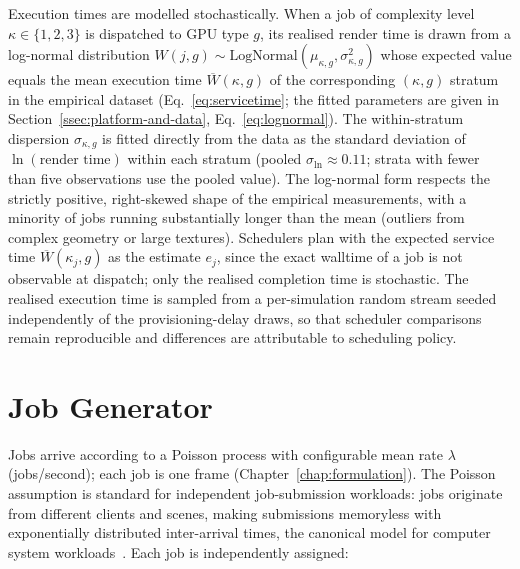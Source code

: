 Execution times are modelled stochastically. When a job of complexity level $\kappa \in \{1, 2, 3\}$ is dispatched to GPU type $g$, its realised render time is drawn from a log-normal distribution $W(j,g) \sim \text{LogNormal}(\mu_{\kappa,g}, \sigma_{\kappa,g}^2)$ whose expected value equals the mean execution time $\overline{W}(\kappa, g)$ of the corresponding $(\kappa, g)$ stratum in the empirical dataset (Eq.~\ref{eq:servicetime}; the fitted parameters are given in Section~\ref{ssec:platform-and-data}, Eq.~\ref{eq:lognormal}). The within-stratum dispersion $\sigma_{\kappa,g}$ is fitted directly from the data as the standard deviation of $\ln(\text{render time})$ within each stratum (pooled $\sigma_{\ln} \approx 0.11$; strata with fewer than five observations use the pooled value). The log-normal form respects the strictly positive, right-skewed shape of the empirical measurements, with a minority of jobs running substantially longer than the mean (outliers from complex geometry or large textures). Schedulers plan with the expected service time $\overline{W}(\kappa_j, g)$ as the estimate $e_j$, since the exact walltime of a job is not observable at dispatch; only the realised completion time is stochastic. The realised execution time is sampled from a per-simulation random stream seeded independently of the provisioning-delay draws, so that scheduler comparisons remain reproducible and differences are attributable to scheduling policy.

\section{Job Generator}
\label{sec:job-generator}

Jobs arrive according to a Poisson process with configurable mean rate $\lambda$ (jobs/second); each job is one frame (Chapter~\ref{chap:formulation}). The Poisson assumption is standard for independent job-submission workloads: jobs originate from different clients and scenes, making submissions memoryless with exponentially distributed inter-arrival times, the canonical model for computer system workloads~\cite{banks2010discrete}. Each job is independently assigned:

